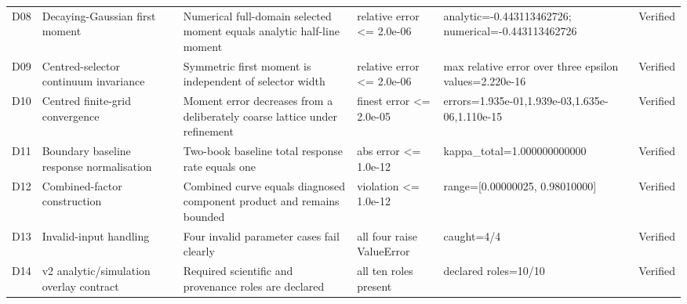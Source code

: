 \begin{table}[H]
\begin{tabularx}{\linewidth}{@{}p{0.9cm}p{3.6cm}X p{3.0cm}X p{1.8cm}@{}}
D08 & Decaying-Gaussian first moment & Numerical full-domain selected moment equals analytic half-line moment & relative error <= 2.0e-06 & analytic=-0.443113462726; numerical=-0.443113462726 & Verified \\
D09 & Centred-selector continuum invariance & Symmetric first moment is independent of selector width & relative error <= 2.0e-06 & max relative error over three epsilon values=2.220e-16 & Verified \\
D10 & Centred finite-grid convergence & Moment error decreases from a deliberately coarse lattice under refinement & finest error <= 2.0e-05 & errors=1.935e-01,1.939e-03,1.635e-06,1.110e-15 & Verified \\
D11 & Boundary baseline response normalisation & Two-book baseline total response rate equals one & abs error <= 1.0e-12 & kappa\_total=1.000000000000 & Verified \\
D12 & Combined-factor construction & Combined curve equals diagnosed component product and remains bounded & violation <= 1.0e-12 & range=[0.00000025, 0.98010000] & Verified \\
D13 & Invalid-input handling & Four invalid parameter cases fail clearly & all four raise ValueError & caught=4/4 & Verified \\
D14 & v2 analytic/simulation overlay contract & Required scientific and provenance roles are declared & all ten roles present & declared roles=10/10 & Verified \\
\bottomrule
\end{tabularx}
\end{table}
